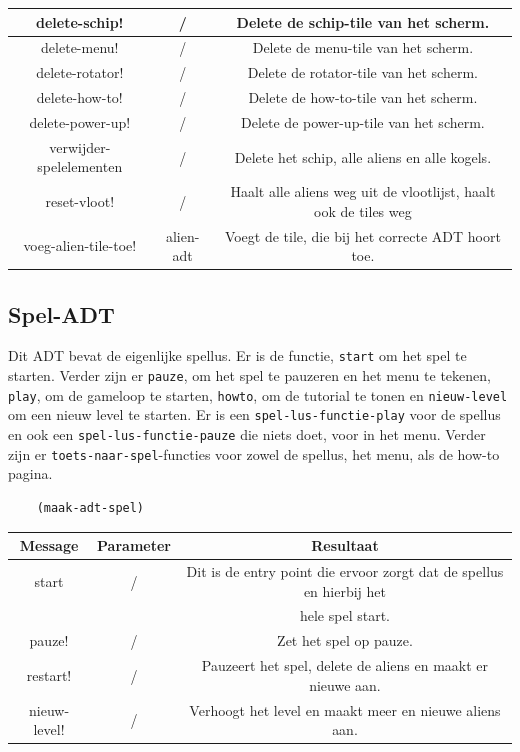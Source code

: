 \documentclass[]{article}
\begin{document}
\begin{center}
\begin{tabular}{|c|c|c|}
		\hline delete-schip! & / & Delete de schip-tile van het scherm. \\
		\hline delete-menu! & / & Delete de menu-tile van het scherm. \\
		\hline delete-rotator! & / & Delete de rotator-tile van het scherm. \\
		\hline delete-how-to! & / & Delete de how-to-tile van het scherm. \\
		\hline delete-power-up! & / & Delete de power-up-tile van het scherm. \\
		\hline verwijder-spelelementen & / & Delete het schip, alle aliens en alle kogels. \\ 
		\hline reset-vloot! & / & Haalt alle aliens weg uit de vlootlijst, haalt ook de tiles weg \\
		\hline voeg-alien-tile-toe! & alien-adt& Voegt de tile, die bij het correcte ADT hoort toe. \\
		\hline 
	\end{tabular}
\end{center}
\subsection{Spel-ADT}
Dit ADT bevat de eigenlijke spellus. Er is de functie, \texttt{start} om het spel te starten. Verder zijn er \texttt{pauze}, om het spel te pauzeren en het menu te tekenen, \texttt{play}, om de gameloop te starten, \texttt{howto}, om de tutorial te tonen en \texttt{nieuw-level} om een nieuw level te starten. 
Er is een \texttt{spel-lus-functie-play} voor de spellus en ook een \texttt{spel-lus-functie-pauze} die niets doet, voor in het menu. Verder zijn er \texttt{toets-naar-spel}-functies voor zowel de spellus, het menu, als de how-to pagina. \\

\begin{center}
	\begin{lstlisting}
	(maak-adt-spel)
	\end{lstlisting}
	\begin{tabular}{|c|c|c|}
		\hline  \textbf{Message} &\textbf{Parameter} & \textbf{Resultaat}  \\
		\hline start & / & Dit is de entry point die ervoor zorgt dat de spellus en hierbij het \\ & & hele spel start. \\
		\hline pauze! & / & Zet het spel op pauze. \\
		\hline restart! & / & Pauzeert het spel, delete de aliens en maakt er nieuwe aan. \\
		\hline nieuw-level! & / & Verhoogt het level en maakt meer en nieuwe aliens aan. \\
		\hline 
	\end{tabular}
\end{center}
\end{document}
